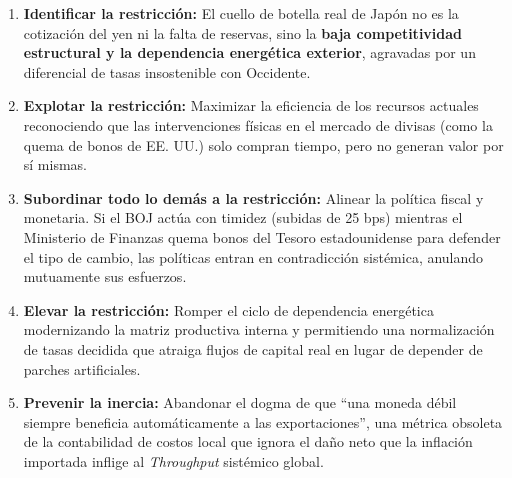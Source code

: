 \documentclass[12pt,letterpaper]{article}
\providecommand{\tightlist}{%
  \setlength{\itemsep}{0pt}\setlength{\parskip}{0pt}}
\begin{document}
\begin{enumerate}
\def\labelenumi{\arabic{enumi}.}
\tightlist
\item
  \textbf{Identificar la restricción:} El cuello de botella real de
  Japón no es la cotización del yen ni la falta de reservas, sino la
  \textbf{baja competitividad estructural y la dependencia energética
  exterior}, agravadas por un diferencial de tasas insostenible con
  Occidente.
\item
  \textbf{Explotar la restricción:} Maximizar la eficiencia de los
  recursos actuales reconociendo que las intervenciones físicas en el
  mercado de divisas (como la quema de bonos de EE. UU.) solo compran
  tiempo, pero no generan valor por sí mismas.
\item
  \textbf{Subordinar todo lo demás a la restricción:} Alinear la
  política fiscal y monetaria. Si el BOJ actúa con timidez (subidas de
  25 bps) mientras el Ministerio de Finanzas quema bonos del Tesoro
  estadounidense para defender el tipo de cambio, las políticas entran
  en contradicción sistémica, anulando mutuamente sus esfuerzos.
\item
  \textbf{Elevar la restricción:} Romper el ciclo de dependencia
  energética modernizando la matriz productiva interna y permitiendo una
  normalización de tasas decidida que atraiga flujos de capital real en
  lugar de depender de parches artificiales.
\item
  \textbf{Prevenir la inercia:} Abandonar el dogma de que ``una moneda
  débil siempre beneficia automáticamente a las exportaciones'', una
  métrica obsoleta de la contabilidad de costos local que ignora el daño
  neto que la inflación importada inflige al \emph{Throughput} sistémico
  global.
\end{enumerate}
\end{document}

